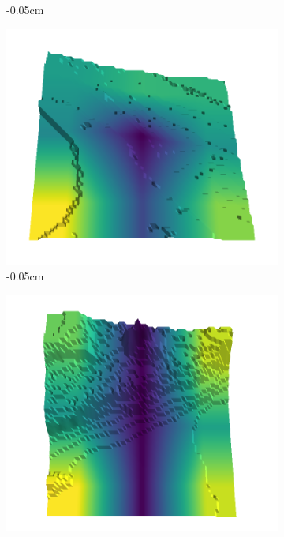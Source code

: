 \documentclass[../document.tex]{subfiles}
\begin{document}
\begin{figure}[H]
\begin{subfigure}[b]{0.242\linewidth}
        \caption{-0.05cm}
        \end{subfigure}
        \begin{subfigure}[b]{0.242\linewidth}
        \includegraphics[width=\linewidth]{../img/5/quarry/false_negative/05-patch-3d-majavi-colormap-40.png}
        \caption{-0.05cm}
        \end{subfigure}
        \begin{subfigure}[b]{0.242\linewidth}
        \includegraphics[width=\linewidth]{../img/5/quarry/false_negative/06-patch-3d-majavi-colormap-45.png}

\end{subfigure}
\end{figure}
\end{document}

